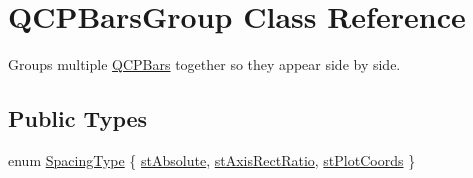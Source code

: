 \hypertarget{classQCPBarsGroup}{\section{\-Q\-C\-P\-Bars\-Group \-Class \-Reference}
\label{classQCPBarsGroup}
}


\-Groups multiple \hyperlink{classQCPBars}{\-Q\-C\-P\-Bars} together so they appear side by side.  


\subsection*{\-Public \-Types}
\begin{DoxyCompactItemize}
\item 
enum \hyperlink{classQCPBarsGroup_a4c0521120a97e60bbca37677a37075b6}{\-Spacing\-Type} \{ \hyperlink{classQCPBarsGroup_a4c0521120a97e60bbca37677a37075b6ab53fa3efaf14867dd0f14d41d64e42ac}{st\-Absolute}, 
\hyperlink{classQCPBarsGroup_a4c0521120a97e60bbca37677a37075b6ae94b05c27bc985dcdd8b1e1b7f163d26}{st\-Axis\-Rect\-Ratio}, 
\hyperlink{classQCPBarsGroup_a4c0521120a97e60bbca37677a37075b6ad369cee6287e0a86e8c2b643a3168c54}{st\-Plot\-Coords}
 \}
\end{DoxyCompactItemize}
